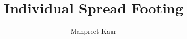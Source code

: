 \title{Individual Spread Footing}
\author{Manpreet Kaur}
\begin{titlepage}
     \maketitle
    \tableofcontents
\end{titlepage}
